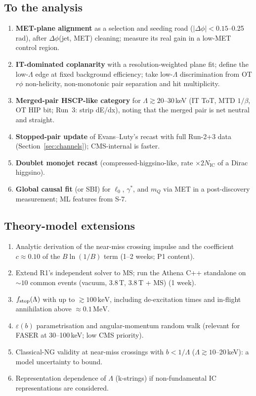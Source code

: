 \documentclass[11pt,a4paper]{article}
\DeclareRobustCommand{\file}[1]{\path{#1}}
\newcommand{\mQ}{m_Q}
\newcommand{\NIC}{N_{\mathrm{IC}}}
\newcommand{\keV}{\ensuremath{\,\mathrm{keV}}}
\newcommand{\MeV}{\ensuremath{\,\mathrm{MeV}}}
\newcommand{\gst}{\gamma^*}
\begin{document}
\subsection{To the analysis}
\begin{enumerate}
\item \textbf{MET-plane alignment} as a selection and seeding road ($|\Delta\phi|<0.15$--0.25\,rad), after $\Delta\phi$(jet, MET) cleaning; measure its real gain in a low-MET control region.
\item \textbf{IT-dominated coplanarity} with a resolution-weighted plane fit; define the low-$\Lambda$ edge at fixed background efficiency; take low-$\Lambda$ discrimination from OT $r\phi$ non-helicity, non-monotonic pair separation and hit multiplicity.
\item \textbf{Merged-pair HSCP-like category} for $\Lambda\gtrsim20$--30\,keV (IT ToT, MTD $1/\beta$, OT HIP bit; Run~3: strip dE/dx), noting that the merged pair is net neutral and straight.
\item \textbf{Stopped-pair update} of Evans--Luty's recast with full Run-2+3 data (Section~\ref{sec:channels}); CMS-internal is faster.
\item \textbf{Doublet monojet recast} (compressed-higgsino-like, rate $\times2\NIC$ of a Dirac higgsino).
\item \textbf{Global causal fit} (or SBI) for $\ell_0$, $\gst$, and $\mQ$ via MET in a post-discovery measurement; ML features from S-7.
\end{enumerate}

\subsection{Theory-model extensions}
\begin{enumerate}
\item Analytic derivation of the near-miss crossing impulse and the coefficient $c\approx0.10$ of the $B\ln(1/B)$ term (1--2 weeks; P1 content).
\item Extend R1's independent solver to MS; run the Athena C++ standalone on $\sim10$ common events (vacuum, 3.8\,T, 3.8\,T + MS) (1 week).
\item $f_{\rm stop}(\Lambda)$ with \file{T3_causal.py} up to $\gtrsim100\keV$, including de-excitation times and in-flight annihilation above $\approx0.1\MeV$.
\item $\varepsilon(b)$ parametrisation and angular-momentum random walk (relevant for FASER at 30--100\,keV; low CMS priority).
\item Classical-NG validity at near-miss crossings with $b<1/\Lambda$ ($\Lambda\gtrsim10$--20\,keV): a model uncertainty to bound.
\item Representation dependence of $\Lambda$ (k-strings) if non-fundamental IC representations are considered.
\end{enumerate}
\end{document}
